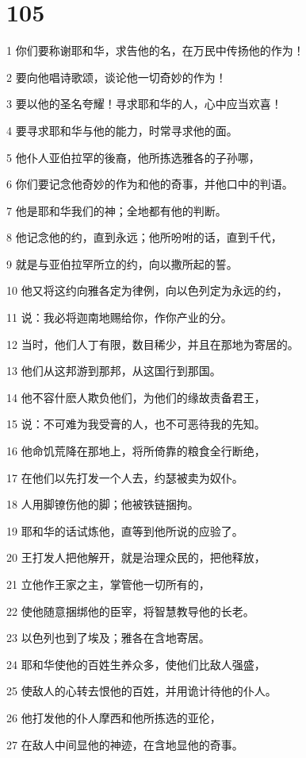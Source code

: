 \chapter{105}

\par 1 你们要称谢耶和华，求告他的名，在万民中传扬他的作为！
\par 2 要向他唱诗歌颂，谈论他一切奇妙的作为！
\par 3 要以他的圣名夸耀！寻求耶和华的人，心中应当欢喜！
\par 4 要寻求耶和华与他的能力，时常寻求他的面。
\par 5 他仆人亚伯拉罕的後裔，他所拣选雅各的子孙哪，
\par 6 你们要记念他奇妙的作为和他的奇事，并他口中的判语。
\par 7 他是耶和华我们的神；全地都有他的判断。
\par 8 他记念他的约，直到永远；他所吩咐的话，直到千代，
\par 9 就是与亚伯拉罕所立的约，向以撒所起的誓。
\par 10 他又将这约向雅各定为律例，向以色列定为永远的约，
\par 11 说：我必将迦南地赐给你，作你产业的分。
\par 12 当时，他们人丁有限，数目稀少，并且在那地为寄居的。
\par 13 他们从这邦游到那邦，从这国行到那国。
\par 14 他不容什麽人欺负他们，为他们的缘故责备君王，
\par 15 说：不可难为我受膏的人，也不可恶待我的先知。
\par 16 他命饥荒降在那地上，将所倚靠的粮食全行断绝，
\par 17 在他们以先打发一个人去，约瑟被卖为奴仆。
\par 18 人用脚镣伤他的脚；他被铁链捆拘。
\par 19 耶和华的话试炼他，直等到他所说的应验了。
\par 20 王打发人把他解开，就是治理众民的，把他释放，
\par 21 立他作王家之主，掌管他一切所有的，
\par 22 使他随意捆绑他的臣宰，将智慧教导他的长老。
\par 23 以色列也到了埃及；雅各在含地寄居。
\par 24 耶和华使他的百姓生养众多，使他们比敌人强盛，
\par 25 使敌人的心转去恨他的百姓，并用诡计待他的仆人。
\par 26 他打发他的仆人摩西和他所拣选的亚伦，
\par 27 在敌人中间显他的神迹，在含地显他的奇事。
